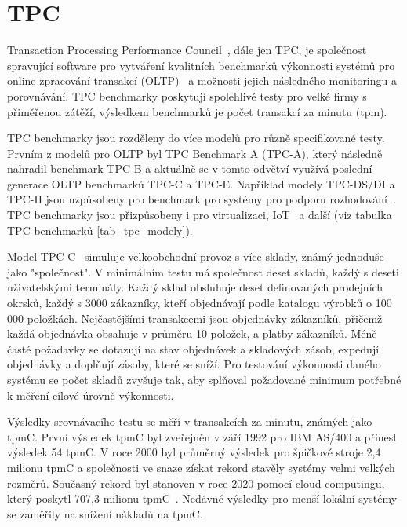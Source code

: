 \documentclass[czech,master,dept460,male,csharp,cpdeclaration]{diploma}
\begin{document}
	\section{TPC}
	
	Transaction Processing Performance Council~\cite{tpc}, dále jen TPC, je společnost spravující software pro vytváření kvalitních benchmarků výkonnosti systémů pro online zpracování transakcí (OLTP)~\cite{oltp} a možnosti jejich následného monitoringu a porovnávání. TPC benchmarky poskytují spolehlivé testy pro velké firmy s přiměřenou zátěží, výsledkem benchmarků je počet transakcí za minutu (tpm).
	
	TPC benchmarky jsou rozděleny do více modelů pro různě specifikované testy. Prvním z modelů pro OLTP byl TPC Benchmark A (TPC-A), který následně nahradil benchmark TPC-B a aktuálně se v tomto odvětví využívá poslední generace OLTP benchmarků TPC-C a TPC-E. Například modely TPC-DS/DI a TPC-H jsou uzpůsobeny pro benchmark pro systémy pro podporu rozhodování~\cite{dss}. TPC benchmarky jsou přizpůsobeny i pro virtualizaci, IoT~\cite{iot} a další (viz tabulka TPC benchmarků \ref{tab_tpc_modely}).
	
	Model TPC-C~\cite{tpc-c} simuluje velkoobchodní provoz s více sklady, známý jednoduše jako "společnost". V minimálním testu má společnost deset skladů, každý s deseti uživatelskými terminály. Každý sklad obsluhuje deset definovaných prodejních okrsků, každý s 3000 zákazníky, kteří objednávají podle katalogu výrobků o 100 000 položkách. Nejčastějšími transakcemi jsou objednávky zákazníků, přičemž každá objednávka obsahuje v průměru 10 položek, a platby zákazníků. Méně časté požadavky se dotazují na stav objednávek a skladových zásob, expedují objednávky a doplňují zásoby, které se sníží. Pro testování výkonnosti daného systému se počet skladů zvyšuje tak, aby splňoval požadované minimum potřebné k měření cílové úrovně výkonnosti.
	
	Výsledky srovnávacího testu se měří v transakcích za minutu, známých jako tpmC. První výsledek tpmC byl zveřejněn v září 1992 pro IBM AS/400 a přinesl výsledek 54 tpmC. V roce 2000 byl průměrný výsledek pro špičkové stroje 2,4 milionu tpmC a společnosti ve snaze získat rekord stavěly systémy velmi velkých rozměrů. Současný rekord byl stanoven v roce 2020 pomocí cloud computingu, který poskytl 707,3 milionu tpmC~\cite{tpc-c-top-result}. Nedávné výsledky pro menší lokální systémy se zaměřily na snížení nákladů na tpmC.
	
\end{document}
